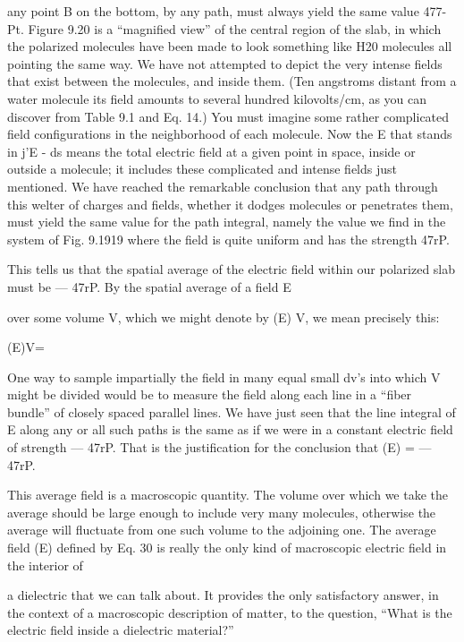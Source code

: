 {any point B on the bottom, by any path, must always yield the same
value 477-Pt. Figure 9.20 is a ``magnified view'' of the central region
of the slab, in which the polarized molecules have been made to look
something like H20 molecules all pointing the same way. We have
not attempted to depict the very intense fields that exist between the
molecules, and inside them. (Ten angstroms distant from a water
molecule its field amounts to several hundred kilovolts/cm, as you
can discover from Table 9.1 and Eq. 14.) You must imagine some
rather complicated field configurations in the neighborhood of each
molecule. Now the E that stands in j'E - ds means the total electric
field at a given point in space, inside or outside a molecule; it includes
these complicated and intense fields just mentioned. We
have reached the remarkable conclusion that any path through this
welter of charges and fields, whether it dodges molecules or penetrates
them, must yield the same value for the path integral, namely
the value we find in the system of Fig. 9.1919 where the field is quite
uniform and has the strength 47rP.

This tells us that the spatial average of the electric field within our
polarized slab must be  --- 47rP. By the spatial average of a field E

over some volume V, which we might denote by (E) V, we mean
precisely this:

\begin{equation}
\end{equation}
(E)V=%

One way to sample impartially the field in many equal small dv's
into which V might be divided would be to measure the field along
each line in a ``fiber bundle'' of closely spaced parallel lines. We
have just seen that the line integral of E along any or all such paths
is the same as if we were in a constant electric field of strength  ---  47rP.
That is the justification for the conclusion that (E) =  --- 47rP.

This average field is a macroscopic quantity. The volume over
which we take the average should be large enough to include very
many molecules, otherwise the average will fluctuate from one such
volume to the adjoining one. The average field (E) defined by Eq. 30
is really the only kind of macroscopic electric field in the interior of

a dielectric that we can talk about. It provides the only satisfactory
answer, in the context of a macroscopic description of matter, to the
question, ``What is the electric field inside a dielectric material?''

}
